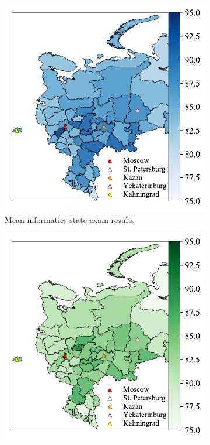 \documentclass{article}
\begin{document}
\begin{figure}[t!]
  \centering 
  \begin{subfigure}{0.49\textwidth}
    \includegraphics[width=\linewidth]{../gfx/map_informatics.pdf}
    \caption{Mean informatics state exam results}
    \label{fig:mapinf}
  \end{subfigure} 
  \begin{subfigure}{0.49\textwidth}
    \includegraphics[width=\linewidth]{../gfx/map_math.pdf}

\end{subfigure}
\end{figure}
\end{document}
